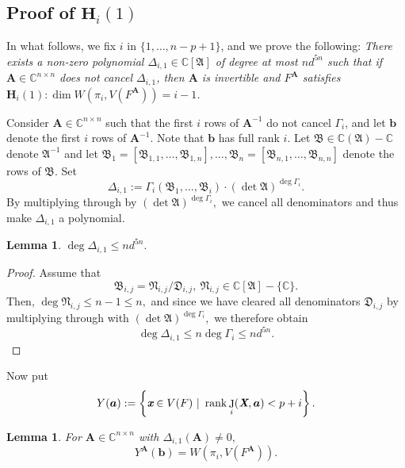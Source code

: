 \documentclass[a4paper]{article}
\def\fB{{\mathfrak B}}
\def\fN{{\mathfrak N}}
\def\fD{{\mathfrak D}}
\def\A{\mathfrak{A}}
\def\Xb{\textit{\textbf{X}}}
\def\mA{{\bm A}}
\def\xb{\textit{\textbf{x}}}
\def\D{\Delta}
\DeclareMathOperator{\J}{J}
\DeclareMathOperator{\rk}{rank}
\def\C{\mathbb{C}}
\def\gi{\Gamma_i}
\newtheorem{lemma}[theorem]{Lemma}
\begin{document}
    
    
   
    \subsection{Proof of $\textbf{H}_i(1)$} 
     In what follows, we fix $i$ in $\{1,\dots,n-p+1\}$, and
    we prove the following: {\em There exists a non-zero polynomial
    $\D_{i,1} \in \C[\A]$ of degree at most $nd^{5n}$ such that if $\mA
    \in \C^{n\times n}$ does not cancel $\D_{i,1}$, then $\mA$ is
    invertible and $F^\mA$ satisfies $\textbf{H}_i(1): \dim W(\pi_i,V(F^{\mA}))=i-1$.}
    
    Consider $\bm A \in \C^{n \times n}$ such that the first $i$ rows of $\bm A^{-1}$ do not cancel $\gi$, and let $\bm b$ denote the first $i$ rows of $\bm A^{-1}$. Note that $\bm b$ has full rank $i$. Let $\fB \in \C(\A)-\C$ denote $\A^{-1}$ and let $\fB_1=[\fB_{1,1},\hdots,\fB_{1,n}],\hdots,\fB_n=[\fB_{n,1},\hdots,\fB_{n,n}]$ denote the rows of $\fB.$ Set  
    \[
    \Delta_{i,1} := \Gamma_i(\fB_1,\hdots,\fB_i)\cdot (\det \A)^{\deg \gi}. 
    \]
    By multiplying through by $(\det \A)^{\deg \gi},$ we cancel all denominators and thus make $\D_{i,1}$ a polynomial. 
    \begin{lemma}
    $\deg \Delta_{i,1} \leq nd^{5n}.$
    \end{lemma}
    \begin{proof}
        Assume that 
        \[
        \fB_{i,j}=\fN_{i,j}/\fD_{i,j},~ \fN_{i,j} \in \C[\A]-\{\C\}.
        \]
        Then, $\deg \fN_{i,j} \leq n-1 \leq n,$ and since we have cleared all denominators $\fD_{i,j}$ by multiplying through with $(\det \A)^{\deg \gi},$ we therefore obtain 
        \[
        \deg \Delta_{i,1} \leq n\deg \gi \leq nd^{5n}.
        \]
    \end{proof}
    \noindent
    Now put 
    \[
    Y(\bm a) := \left\{\xb \in V(F)~|~\rk \J_i(\Xb,\bm a) < p+i\right\}.
    \]
    \begin{lemma}
    For $\mA \in \C^{n \times n}$ with $\Delta_{i,1}(\mA) \not = 0,$ 
    \[
    Y^{\mA}(\bm b) = W\left(\pi_i,V\left(F^{\mA}\right)\right).
    \]
    \end{lemma}
\end{document}
